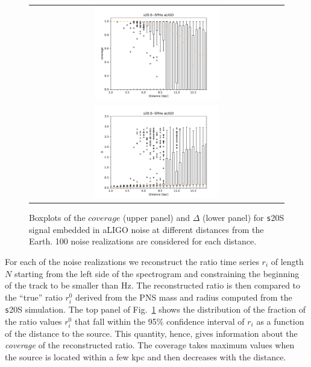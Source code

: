 \begin{figure}[t]
  \centering
  \begin{tabular}{c}
    \includegraphics[width=0.5\textwidth]{plots/s20--SFHo_covpbb_boxplot_aLIGO} \\
    \includegraphics[width=0.5\textwidth]{plots/s20--SFHo_error_boxplot_aLIGO} \\
  \end{tabular}
    
 \caption{Boxplots of the $coverage$ (upper panel) and $\Delta$ (lower panel) for {\texttt s20S} signal embedded in aLIGO noise at different distances from the Earth. 100 noise realizations are considered for each distance. }
  \label{fig:s20results}
\end{figure}

For each of the noise realizations we reconstruct the ratio time series {$r_i$} of length $N$ starting from the left side of the spectrogram and constraining the beginning of the track to be smaller than \unit[200]{Hz}. The reconstructed ratio is then compared to the ``true'' ratio {$r_i^0$} derived from the PNS mass and radius computed from the {\texttt s20S} simulation. The top panel of Fig.~\ref{fig:s20results} shows the distribution of the fraction of the ratio values {$r_i^0$} that fall within the 95\% confidence interval of {$r_i$} as a function of the distance to the source. This quantity, hence, gives information about the {\it coverage} of the reconstructed ratio. The coverage takes maximum values when the source is located within a few kpc and then decreases with the distance.

